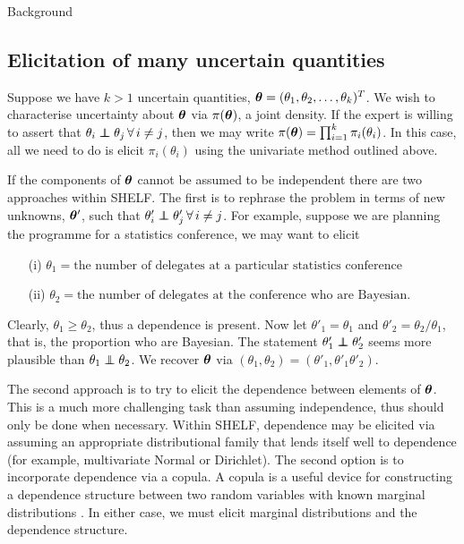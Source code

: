 \begin{chapter}{Background \label{Ch:background}}
\subsection{Elicitation of many uncertain quantities}

Suppose we have $k>1$ uncertain quantities, $\bm{\theta} = (\theta_1, \theta_2, \ldots, \theta_k)^T$. We wish to characterise uncertainty about $\bm{\theta}$ via $\pi(\bm{\theta})$, a joint density. If the expert is willing to assert that $\theta_i \indep \theta_j \,\forall\, i \neq j$, then we may write $\pi(\bm{\theta}) = \prod_{i=1}^k \pi_i (\theta_i)$. In this case, all we need to do is elicit $\pi_i(\theta_i)$ using the univariate method outlined above.

If the components of $\bm{\theta}$ cannot be assumed to be independent there are two approaches within SHELF. The first is to rephrase the problem in terms of new unknowns, $\bm{\theta}'$, such that $\theta'_i \indep \theta'_j \,\forall\, i \neq j$. For example, suppose we are planning the programme for a statistics conference, we may want to elicit
\begin{itemize}
  \item[(i)] $\theta_1 = \text{the number of delegates at a particular statistics conference}$
  \item[(ii)] $\theta_2 = \text{the number of delegates at the conference who are Bayesian}$.
\end{itemize}
Clearly, $\theta_1 \geq \theta_2$, thus a dependence is present. Now let $\theta'_1 = \theta_1$ and $\theta'_2 = \theta_2/\theta_1$, that is, the proportion who are Bayesian. The statement $\theta_1' \indep \theta_2'$ seems more plausible than $\theta_1 \indep \theta_2$. We recover $\bm{\theta}$ via $(\theta_1, \theta_2)  = (\theta'_1, \theta'_1 \theta'_2)$.

The second approach is to try to elicit the dependence between elements of $\bm{\theta}$. This is a much more challenging task than assuming independence, thus should only be done when necessary. Within SHELF, dependence may be elicited via assuming an appropriate distributional family that lends itself well to dependence (for example, multivariate Normal or Dirichlet). The second option is to incorporate dependence via a copula. A copula is a useful device for constructing a dependence structure between two random variables with known marginal distributions \citep{Bedford2014, Elfadaly2017}. In either case, we must elicit marginal distributions and the dependence structure.


\end{chapter}

